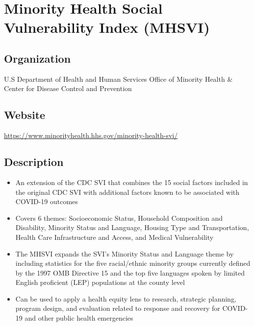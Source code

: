 \documentclass[
]{book}
\providecommand{\tightlist}{%
  \setlength{\itemsep}{0pt}\setlength{\parskip}{0pt}}
\begin{document}
\mainmatter

\hypertarget{minority-health-social-vulnerability-index-mhsvi}{%
\chapter{Minority Health Social Vulnerability Index (MHSVI)}\label{minority-health-social-vulnerability-index-mhsvi}}

\hypertarget{organization-40}{%
\section{Organization}\label{organization-40}}

U.S Department of Health and Human Services Office of Minority Health \& Center for Disease Control and Prevention

\hypertarget{website-40}{%
\section{Website}\label{website-40}}

\url{https://www.minorityhealth.hhs.gov/minority-health-svi/}

\hypertarget{description-40}{%
\section{Description}\label{description-40}}

\begin{itemize}
\tightlist
\item
  An extension of the CDC SVI that combines the 15 social factors included in the original CDC SVI with additional factors known to be associated with COVID-19 outcomes
\item
  Covers 6 themes: Socioeconomic Status, Household Composition and Disability, Minority Status and Language, Housing Type and Transportation, Health Care Infrastructure and Access, and Medical Vulnerability
\item
  The MHSVI expands the SVI's Minority Status and Language theme by including statistics for the five racial/ethnic minority groups currently defined by the 1997 OMB Directive 15 and the top five languages spoken by limited English proficient (LEP) populations at the county level
\item
  Can be used to apply a health equity lens to research, strategic planning, program design, and evaluation related to response and recovery for COVID-19 and other public health emergencies
\end{itemize}
\end{document}

